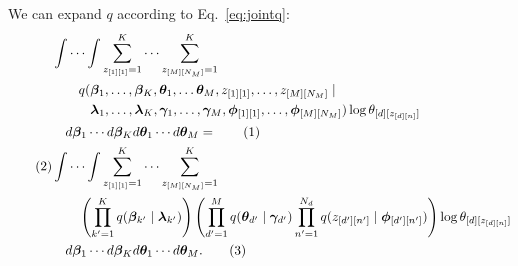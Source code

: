\documentclass[12pt]{article}
\newcommand\numberthis{\addtocounter{equation}{1}\tag{\theequation}}
\begin{document}
We can expand $q$ according to Eq.~\ref{eq:jointq}:
\begin{align*}
    &\int \cdots \int
    \sum_{z_{[1][1]}=1}^{K} \cdots \sum_{z_{[M][N_{M}]}=1}^{K} \\
    &\quad\quad\begin{aligned} q(&\bm{\beta}_{1}, \ldots, \bm{\beta}_{K},
    \bm{\theta}_{1}, \ldots \bm{\theta}_{M}, z_{[1][1]}, \ldots, z_{[M][N_{M}]}
    \mid \\*
    & \bm{\lambda}_{1}, \ldots, \bm{\lambda}_{K}, \bm{\gamma}_{1}, \ldots,
    \bm{\gamma}_{M}, \bm{\phi}_{[1][1]}, \ldots, \bm{\phi}_{[M][N_{M}]})\log
    \theta_{[d][z_{[d][n]}]}
    \end{aligned} \\
    &\quad d\bm{\beta}_{1}\cdots d\bm{\beta}_{K}d\bm{\theta}_{1}\cdots
    d\bm{\theta}_{M} = \numberthis \\
    \numberthis
    &\int \cdots \int
    \sum_{z_{[1][1]}=1}^{K} \cdots \sum_{z_{[M][N_{M}]}=1}^{K} \\
    &\quad\quad\left(\prod_{k'=1}^{K} q(\bm{\beta}_{k'} \mid
    \bm{\lambda}_{k'})\right)
    \left(\prod_{d'=1}^{M}q(\bm{\theta}_{d'} \mid \bm{\gamma}_{d'})
    \prod_{n'=1}^{N_{d}}q(z_{[d'][n']} \mid \bm{\phi}_{[d'][n']})\right)
    \log \theta_{[d][z_{[d][n]}]}\\
    &\quad d\bm{\beta}_{1}\cdots d\bm{\beta}_{K}d\bm{\theta}_{1}\cdots
    d\bm{\theta}_{M}. \numberthis
\end{align*}
\end{document}
